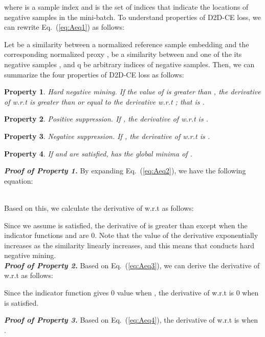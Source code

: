 \documentclass{article}
\newtheorem{property}{Property}
\begin{document}
where  is a sample index and  is the set of indices that indicate the locations of negative samples in the mini-batch. To understand properties of D2D-CE loss, we can rewrite Eq.~(\ref{eq:Aeq1}) as follows:


Let  be a similarity between a normalized reference sample embedding  and the corresponding normalized proxy ,  be a similarity between  and one of the its negative samples , and q be arbitrary indices of negative samples. Then, we can summarize the four properties of D2D-CE loss as follows:

\begin{property}
Hard negative mining.
If the value of  is greater than , the derivative of  w.r.t  is greater than or equal to the derivative w.r.t ; that is    .
\end{property}

\begin{property}
Positive suppression.
If   , the derivative of   w.r.t  is .
\end{property}

\begin{property}
Negative suppression. 
If   , the derivative of   w.r.t  is .
\end{property}

\begin{property}
If  and  are satisfied,  has the global minima of .
\end{property} 


\textbf{\textit{Proof of Property 1.}}
By expanding Eq.~(\ref{eq:Aeq2}), we have the following equation:

\\
Based on this, we calculate the derivative of  w.r.t  as follows:


Since we assume  is satisfied, the derivative of  is greater than  except when the indicator functions  and  are 0. Note that the value of the derivative  exponentially increases as the similarity  linearly increases, and this means that  conducts hard negative mining.\\

\textbf{\textit{Proof of Property 2.}} Based on Eq.~(\ref{eq:Aeq3}), we can derive the derivative of  w.r.t  as follows:

Since the indicator function  gives 0 value when , the derivative of  w.r.t  is 0 when  is satisfied.

\textbf{\textit{Proof of Property 3.}} Based on Eq.~(\ref{eq:Aeq4}), the derivative of  w.r.t  is  when .
\end{document}
